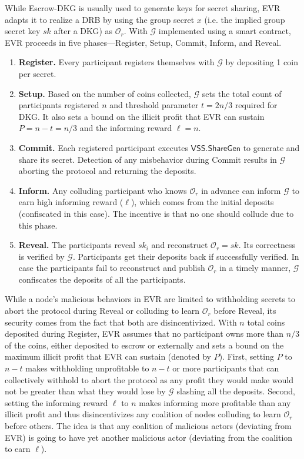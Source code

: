 \documentclass[letterpaper,twocolumn,10pt]{article}
\theoremstyle{definition}
\theoremstyle{remark}
\begin{document}
While Escrow-DKG is usually used to generate keys for secret sharing, EVR adapts it to realize a DRB by using the group secret $x$ (i.e. the implied group secret key $sk$ after a DKG) as $\mathcal{O}_r$. With $\mathcal{G}$ implemented using a smart contract, EVR proceeds in five phases---Register, Setup, Commit, Inform, and Reveal.
\begin{enumerate}
    \item \textbf{Register.} Every participant registers themselves with $\mathcal{G}$ by depositing 1 coin per secret.
    \item \textbf{Setup.} Based on the number of coins collected, $\mathcal{G}$ sets the total count of participants registered $n$ and threshold parameter $t = 2n / 3$ required for DKG. It also sets a bound on the illicit profit that EVR can sustain $P = n - t = n / 3$ and the informing reward $\ell = n$.
    \item \textbf{Commit.} Each registered participant executes $\mathsf{VSS.ShareGen}$ to generate and share its secret. Detection of any misbehavior during Commit results in $\mathcal{G}$ aborting the protocol and returning the deposits.
    \item \textbf{Inform.} Any colluding participant who knows $\mathcal{O}_r$ in advance can inform $\mathcal{G}$ to earn high informing reward ($\ell$), which comes from the initial deposits (confiscated in this case). The incentive is that no one should collude due to this phase.
    \item \textbf{Reveal.} The participants reveal $sk_i$ and reconstruct $\mathcal{O}_r = sk$. Its correctness is verified by $\mathcal{G}$. Participants get their deposits back if successfully verified. In case the participants fail to reconstruct and publish $\mathcal{O}_r$ in a timely manner, $\mathcal{G}$ confiscates the deposits of all the participants.
\end{enumerate}

While a node's malicious behaviors in EVR are limited to withholding secrets to abort the protocol during Reveal or colluding to learn $\mathcal{O}_r$ before Reveal, its security comes from the fact that both are disincentivized. With $n$ total coins deposited during Register, EVR assumes that no participant owns more than $n / 3$ of the coins, either deposited to escrow or externally and sets a bound on the maximum illicit profit that EVR can sustain (denoted by $P$). First, setting $P$ to $n - t$ makes withholding unprofitable to $n - t$ or more participants that can collectively withhold to abort the protocol as any profit they would make would not be greater than what they would lose by $\mathcal{G}$ slashing all the deposits. Second, setting the informing reward $\ell$ to $n$ makes informing more profitable than any illicit profit and thus disincentivizes any coalition of nodes colluding to learn $\mathcal{O}_r$ before others. The idea is that any coalition of malicious actors (deviating from EVR) is going to have yet another malicious actor (deviating from the coalition to earn $\ell$).
\end{document}

